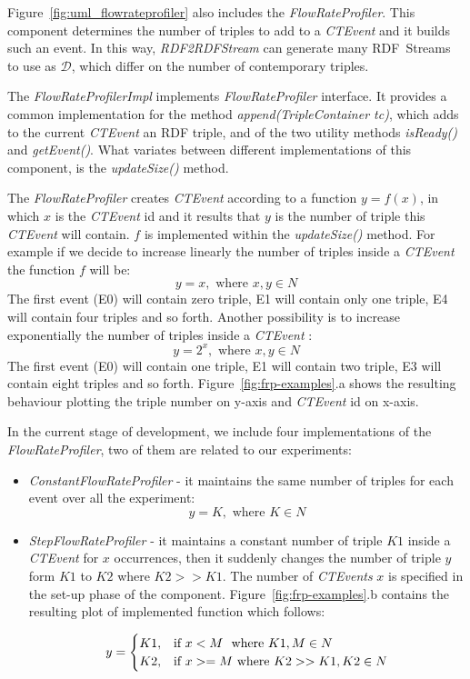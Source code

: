 Figure~\ref{fig:uml_flowrateprofiler} also includes the \textit{FlowRateProfiler}. This component determines the number of triples to add to a \textit{CTEvent} and it builds such an event. In this way, \textit{RDF2RDFStream} can generate many RDF~Streams to use as $\mathcal{D}$, which differ on the number of contemporary triples. 



The \textit{FlowRateProfilerImpl} implements \textit{FlowRateProfiler} interface. It provides a common implementation for the method \textit{append(TripleContainer tc)}, which adds to the current \textit{CTEvent} an RDF triple,  and of the two utility methods \textit{isReady()} and \textit{getEvent()}. What variates between different implementations of this component, is the \textit{updateSize()} method. 

The \textit{FlowRateProfiler} creates \textit{CTEvent} according to a function $y=f(x)$, in which $x$ is the \textit{CTEvent} id and it results that $y$ is the number of triple this \textit{CTEvent} will contain.  $f$ is implemented within the \textit{updateSize()} method. For example if we decide to increase linearly the number of triples inside a \textit{CTEvent} the function $f$ will be: \[y=x, \text{ where } x,y \in N\]
The first event (E0) will contain zero triple, E1 will contain only one triple, E4 will contain four triples and so forth. Another possibility is to increase exponentially the number of triples inside a \textit{CTEvent} : \[y=2^x, \text{ where } x,y \in N\]The first event (E0) will contain one triple, E1 will contain two triple, E3 will contain eight triples and so forth. Figure~\ref{fig:frp-examples}.a shows the resulting behaviour plotting the triple number on y-axis and \textit{CTEvent} id on x-axis.

In the current stage of development, we include four implementations of the \textit{FlowRateProfiler}, two of them are related to our experiments: 
\begin{itemize}
\item \textit{ConstantFlowRateProfiler} - it maintains the same number of triples for each event over all the experiment: \\
\[y=K, \text{ where } K \in N \]

\item \textit{StepFlowRateProfiler} - it maintains a constant number of triple $K1$ inside a \textit{CTEvent} for $x$ occurrences, then it suddenly changes the number of triple $y$ form $K1$ to $K2$ where $K2 >> K1$. The number of  \textit{CTEvents} $x$ is specified in the set-up phase of the component.  Figure~\ref{fig:frp-examples}.b contains the resulting plot of implemented function which follows:

\[
y=
\begin{cases}
K1, &\text{if $x < M$ } $ where $ K1, M \in N\\
K2, &\text{if $x >= M$} $ where $ K2 >> K1, K2 \in N
\end{cases}
\]


\end{itemize}

